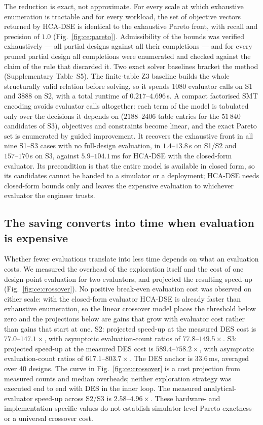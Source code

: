 \documentclass[pdflatex,sn-nature,lineno]{sn-jnl}
\newcommand{\DesCostMs}{33.6}
\newcommand{\RefCrossoverFig}{Fig.~\ref{fig:ce:crossover}}
\newcommand{\RefSolverTab}{Supplementary Table~S5}
\begin{document}
The reduction is exact, not approximate. For every scale at which exhaustive enumeration
is tractable and for every workload, the set of objective vectors returned by HCA-DSE is
identical to the exhaustive Pareto front, with recall and precision of $1.0$
(Fig.~\ref{fig:ce:pareto}). Admissibility of the bounds was verified exhaustively --- all
partial designs against all their completions --- and for every pruned partial design all
completions were enumerated and checked against the claim of the rule that discarded it.
%
Two exact solver baselines bracket the method (\RefSolverTab{}). The finite-table Z3 baseline builds the whole structurally valid relation before solving, so it spends 1080 evaluator calls on S1 and 3888 on S2, with a total runtime of $0.217\text{--}4.696$\,s. A compact factorised SMT encoding avoids evaluator calls altogether: each term of the model is tabulated only over the decisions it depends on ($2188\text{--}2406$ table entries for the $51\,840$ candidates of S3), objectives and constraints become linear, and the exact Pareto set is enumerated by guided improvement. It recovers the exhaustive front in all nine S1--S3 cases with no full-design evaluation, in $1.4\text{--}13.8$\,s on S1/S2 and $157\text{--}170$\,s on S3, against $5.9\text{--}104.1$\,ms for HCA-DSE with the closed-form evaluator. Its precondition is that the entire model is available in closed form, so its candidates cannot be handed to a simulator or a deployment; HCA-DSE needs closed-form bounds only and leaves the expensive evaluation to whichever evaluator the engineer trusts.

\subsection{The saving converts into time when evaluation is expensive}
Whether fewer evaluations translate into less time depends on what an evaluation costs.
We measured the overhead of the exploration itself and the cost of one design-point
evaluation for two evaluators, and projected the resulting speed-up
(Fig.~\ref{fig:ce:crossover}).
%
No positive break-even evaluation cost was observed on either scale: with the closed-form evaluator HCA-DSE is already faster than exhaustive enumeration, so the linear crossover model places the threshold below zero and the projections below are gains that grow with evaluator cost rather than gains that start at one.
S2: projected speed-up at the measured DES cost is $77.0\text{--}147.1\times$, with asymptotic evaluation-count ratios of $77.8\text{--}149.5\times$.
S3: projected speed-up at the measured DES cost is $589.4\text{--}758.2\times$, with asymptotic evaluation-count ratios of $617.1\text{--}803.7\times$. The DES anchor is $\DesCostMs$\,ms, averaged over 40 designs. The curve in
\RefCrossoverFig{} is a cost projection from measured counts and median overheads;
neither exploration strategy was executed end to end with DES in the inner loop.
The measured analytical-evaluator speed-up across S2/S3 is $2.58\text{--}4.96\times$. These hardware- and implementation-specific values do not establish
simulator-level Pareto exactness or a universal crossover cost.
\end{document}
